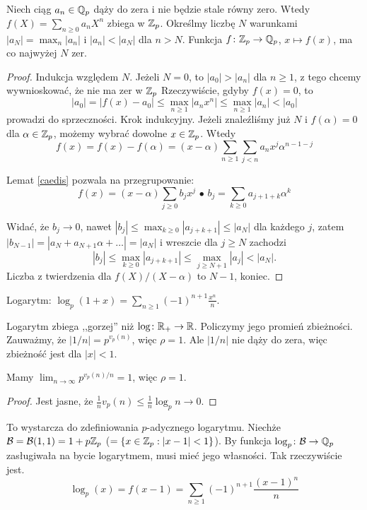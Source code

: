 \begin{twierdzenie}[Strassman, 1928]
	Niech ciąg $a_n \in \mathbb{Q}_p$ dąży do zera i nie będzie stale równy zero.
	Wtedy $f(X) = \sum_{n \ge 0} a_n X^n$ zbiega w $\mathbb{Z}_p$.
	Określmy liczbę $N$ warunkami $|a_N| = \max_n |a_n|$ i $|a_n| < |a_N|$ dla $n > N$.
	Funkcja $f \colon \mathbb{Z}_p \to \mathbb{Q}_p$, $x \mapsto f(x)$, ma co najwyżej $N$ zer.
\end{twierdzenie}

\begin{proof}
	Indukcja względem $N$.
	Jeżeli $N = 0$, to $|a_0| > |a_n|$ dla $n \ge 1$, z tego chcemy wywnioskować, że nie ma zer w $\mathbb{Z}_p$
	Rzeczywiście, gdyby $f(x) = 0$, to
	\[
		|a_0| = |f(x) - a_0| \le \max_{n \ge 1}|a_nx^n| \le \max_{n \ge 1} |a_n| < |a_0|
	\]
	prowadzi do sprzeczności.
	Krok indukcyjny.
	Jeżeli znaleźliśmy już $N$ i $f(\alpha) = 0$ dla $\alpha \in \mathbb{Z}_p$, możemy wybrać dowolne $x \in \mathbb{Z}_p$.
	Wtedy
	\[
		f(x) = f(x) - f(\alpha) = (x-\alpha) \sum_{n \ge 1} \sum_{j < n} a_n x^j \alpha^{n-1-j}
	\]

	Lemat \ref{caedis} pozwala na przegrupowanie:
	\[
		f(x) = (x - \alpha) \sum_{j \ge 0} b_j x^j \,\bullet\,
		b_j = \sum_{k \ge 0} a_{j+1+k} \alpha^k
	\]
	
	Widać, że $b_j \to 0$, nawet $|b_j| \le \max_{k \ge 0} |a_{j+k+1}| \le |a_N|$ dla każdego $j$, zatem $|b_{N-1}| = |a_N + a_{N+1}\alpha + \dots| = |a_N|$ i wreszcie dla $j \ge N$ zachodzi
	\[
		|b_j| \le \max_{k \ge 0}|a_{j+k+1}| \le \max_{j \ge N+1} |a_j| < |a_N|.
	\]
	Liczba z twierdzenia dla $f(X)/(X-\alpha)$ to $N-1$, koniec.
\end{proof}

\begin{definicja}
		Logarytm: $\log_p (1+x) = \sum_{n \ge 1} (-1)^{n+1} \frac{x^n}{n}$.
\end{definicja}

Logarytm zbiega ,,gorzej'' niż $\log \colon \mathbb{R}_+ \to \mathbb{R}$.
Policzymy jego promień zbieżności.
Zauważmy, że $|1/n| = p^{v_p(n)}$, więc $\rho = 1$.
Ale $|1/n|$ nie dąży do zera, więc zbieżność jest dla $|x| < 1$.

\begin{lemat}
	Mamy $\lim_{n \to \infty} p^{v_p(n)/n} = 1$, więc $\rho = 1$.
\end{lemat}

\begin{proof}
	Jest jasne, że $\frac 1 n v_p(n) \le \frac 1 n \log_pn \to 0$.
\end{proof}

To wystarcza do zdefiniowania $p$-adycznego logarytmu.
Niechże $\mathcal B =\mathcal B(1, 1) = 1+ p \mathbb{Z}_p$ ($= \{x \in \mathbb{Z}_p : |x-1| < 1\}$).
By funkcja $\log_p \colon \mathcal B \to \mathbb{Q}_p$ zasługiwała na bycie logarytmem, musi mieć jego własności. Tak rzeczywiście jest.
\[
	\log_p(x) = f(x-1) = \sum_{n \ge 1} (-1)^{n+1} \frac{(x-1)^n}{n}
\]

